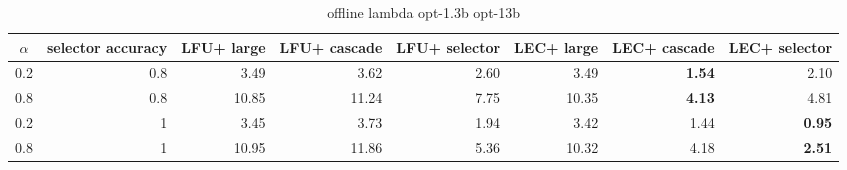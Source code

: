 \begin{table}[ht]
\begin{center}
\begin{tabular}{ cp{3.5em}p{3.2em}p{3.2em}p{3.2em}p{3.2em}p{3.2em}p{3.2em} }
  \toprule
  $\alpha$ & selector accuracy & LFU+ large & LFU+ cascade & LFU+ selector & LEC+ large & LEC+ cascade & LEC+ selector \\ 
  \midrule
  0.2 & \multicolumn{1}{r}{ 0.8 } & \multicolumn{1}{r}{ 3.49 } & \multicolumn{1}{r}{ 3.62 } & \multicolumn{1}{r}{ 2.60 } & \multicolumn{1}{r}{ 3.49 } & \multicolumn{1}{r}{ \textbf{ 1.54 } } & \multicolumn{1}{r}{ 2.10 } \\ 
  0.8 & \multicolumn{1}{r}{ 0.8 } & \multicolumn{1}{r}{ 10.85 } & \multicolumn{1}{r}{ 11.24 } & \multicolumn{1}{r}{ 7.75 } & \multicolumn{1}{r}{ 10.35 } & \multicolumn{1}{r}{ \textbf{ 4.13 } } & \multicolumn{1}{r}{ 4.81 } \\ 
  \midrule
  0.2 & \multicolumn{1}{r}{ 1 } & \multicolumn{1}{r}{ 3.45 } & \multicolumn{1}{r}{ 3.73 } & \multicolumn{1}{r}{ 1.94 } & \multicolumn{1}{r}{ 3.42 } & \multicolumn{1}{r}{ 1.44 } & \multicolumn{1}{r}{ \textbf{ 0.95 } } \\ 
  0.8 & \multicolumn{1}{r}{ 1 } & \multicolumn{1}{r}{ 10.95 } & \multicolumn{1}{r}{ 11.86 } & \multicolumn{1}{r}{ 5.36 } & \multicolumn{1}{r}{ 10.32 } & \multicolumn{1}{r}{ 4.18 } & \multicolumn{1}{r}{ \textbf{ 2.51 } } \\ 
  \bottomrule
\end{tabular}
\end{center}
\caption{offline lambda opt-1.3b opt-13b}
\label{tab:offline_lambda_opt-1.3b_opt-13b}
\end{table}
